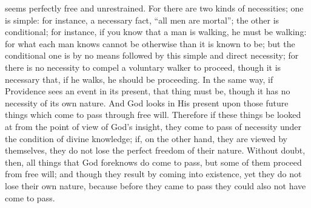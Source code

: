 seems perfectly free and unrestrained. For there are two kinds of
necessities; one is simple: for instance, a necessary fact, ``all men
are mortal''; the other is conditional; for instance, if you know that
a man is walking, he must be walking: for what each man knows cannot
be otherwise than it is known to be; but the conditional one is by no
means followed by this simple and direct necessity; for there is no
necessity to compel a voluntary walker to proceed, though it is
necessary that, if he walks, he should be proceeding. In the same way,
if Providence sees an event in its present, that thing must be, though
it has no necessity of its own nature. And God looks in His present
upon those future things which come to pass through free will.
Therefore if these things be looked at from the point of view of God's
insight, they come to pass of necessity under the condition of divine
knowledge; if, on the other hand, they are viewed by themselves, they
do not lose the perfect freedom of their nature. Without doubt, then,
all things that God foreknows do come to pass, but some of them
proceed from free will; and though they result by coming into
existence, yet they do not lose their own nature, because before they
came to pass they could also not have come to pass.

